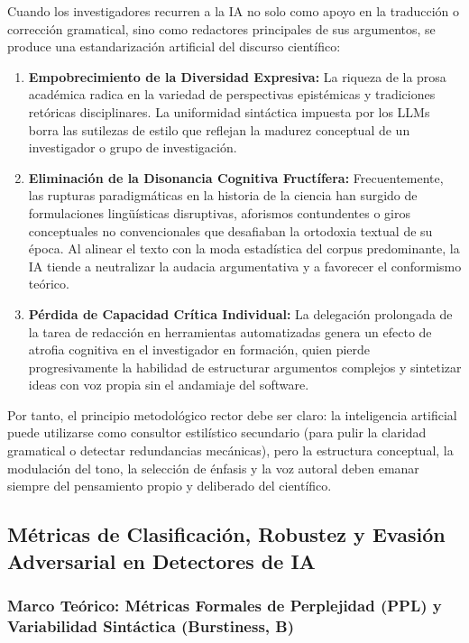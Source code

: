 Cuando los investigadores recurren a la IA no solo como apoyo en la traducción o corrección gramatical, sino como redactores principales de sus argumentos, se produce una estandarización artificial del discurso científico:
\begin{enumerate}
    \item \textbf{Empobrecimiento de la Diversidad Expresiva:} La riqueza de la prosa académica radica en la variedad de perspectivas epistémicas y tradiciones retóricas disciplinares. La uniformidad sintáctica impuesta por los LLMs borra las sutilezas de estilo que reflejan la madurez conceptual de un investigador o grupo de investigación.
    \item \textbf{Eliminación de la Disonancia Cognitiva Fructífera:} Frecuentemente, las rupturas paradigmáticas en la historia de la ciencia han surgido de formulaciones lingüísticas disruptivas, aforismos contundentes o giros conceptuales no convencionales que desafiaban la ortodoxia textual de su época. Al alinear el texto con la moda estadística del corpus predominante, la IA tiende a neutralizar la audacia argumentativa y a favorecer el conformismo teórico.
    \item \textbf{Pérdida de Capacidad Crítica Individual:} La delegación prolongada de la tarea de redacción en herramientas automatizadas genera un efecto de atrofia cognitiva en el investigador en formación, quien pierde progresivamente la habilidad de estructurar argumentos complejos y sintetizar ideas con voz propia sin el andamiaje del software.
\end{enumerate}

Por tanto, el principio metodológico rector debe ser claro: la inteligencia artificial puede utilizarse como consultor estilístico secundario (para pulir la claridad gramatical o detectar redundancias mecánicas), pero la estructura conceptual, la modulación del tono, la selección de énfasis y la voz autoral deben emanar siempre del pensamiento propio y deliberado del científico.
\subsection{Métricas de Clasificación, Robustez y Evasión Adversarial en Detectores de IA}

\subsubsection{Marco Teórico: Métricas Formales de Perplejidad (PPL) y Variabilidad Sintáctica (Burstiness, B)}

